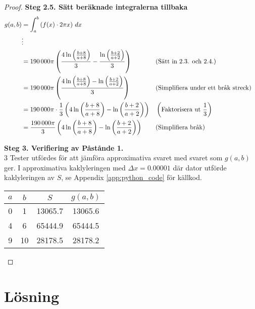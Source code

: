 \documentclass{article}
\begin{document}
\begin{proof}
\textbf{Steg 2.5. Sätt beräknade integralerna tillbaka}
\begin{align*}
	g(a,b) &= \int_{a}^{b}{\left(f(x) \cdot 2\pi x\right) \, dx } \\
	       &\vdots \\
	       &= 190\,000\pi \left( 
\frac{4\ln{\left(\frac{b + 8}{a + 8}\right)}}{3}
- \frac{\ln\left({\frac{{b + 2}}{{a + 2}}}\right)}{3}
	       \right) 
	       &&\text{(Sätt in 2.3. och 2.4.)}
	       \\
	       &= 190\,000\pi \left( 
		       \frac{4\ln{\left(\frac{b + 8}{a + 8}\right)}
		       - \ln\left({\frac{b + 2}{a + 2}}\right)}
		       {3} 
	       \right) 
	       &&\text{(Simplifiera under ett bråk streck)} \\
	       &= 190\,000\pi \cdot
		       \frac{1}{3}  
	       \left( 
		       4\ln{\left(\frac{b + 8}{a + 8}\right)}
		       - \ln\left({\frac{b + 2}{a + 2}}\right)
	       \right)
	       &&\left( \text{Faktorisera ut \( \frac{1}{3} \)} \right) \\
	       &= \frac{190\,000\pi}
		       {3}  
	       \left( 
		       4\ln{\left(\frac{b + 8}{a + 8}\right)}
		       - \ln\left({\frac{b + 2}{a + 2}}\right)
	       \right)
	       &&\text{(Simplifiera bråk)} \\
\end{align*}

\textbf{Steg 3. Verifiering av Påstånde 1.} \\
3 Tester utfördes för att jämföra approximativa svaret med svaret som \( g(a,
b) \) ger. I approximativa kaklyleringen med \( \Delta x = 0.00001 \) där 
dator utförde kaklyleringen av \( S \), se Appendix \ref{app:python_code} för källkod.
\begin{center}
	\begin{tabular}{c|c|c|c}
		$a$ & $b$ & $S$ & $g(a, b)$ \\
		\hline\hline
		0 & 1 & 13065.7 & 13065.6 \\
		\hline
		4 & 6 & 65444.9 & 65444.5 \\
		\hline
		9 & 10 & 28178.5 & 28178.2  \\
	\end{tabular}
\end{center}
\end{proof}

\newpage
\section*{Lösning}
\end{document}
